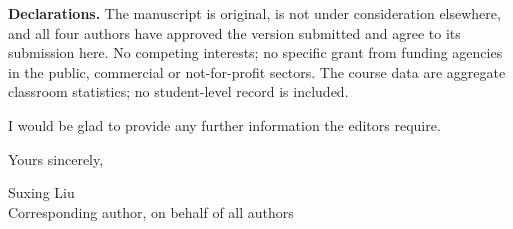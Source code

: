 \documentclass[10pt,a4paper]{article}
\begin{document}
\textbf{Declarations.} The manuscript is original, is not under consideration
elsewhere, and all four authors have approved the version submitted and agree to
its submission here. No competing interests; no specific grant from funding
agencies in the public, commercial or not-for-profit sectors. The course data are
aggregate classroom statistics; no student-level record is included.

I would be glad to provide any further information the editors require.

\vspace{2pt}
Yours sincerely,

Suxing Liu\\
Corresponding author, on behalf of all authors
\end{document}
